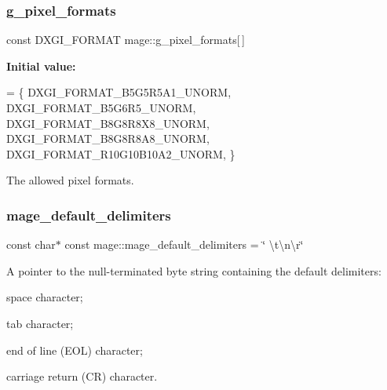 \subsubsection{\texorpdfstring{g\+\_\+pixel\+\_\+formats}{g\_pixel\_formats}}
{\footnotesize\ttfamily const D\+X\+G\+I\+\_\+\+F\+O\+R\+M\+AT mage\+::g\+\_\+pixel\+\_\+formats\mbox{[}$\,$\mbox{]}}

{\bfseries Initial value\+:}
\begin{DoxyCode}
= \{
        DXGI\_FORMAT\_B5G5R5A1\_UNORM,    
        DXGI\_FORMAT\_B5G6R5\_UNORM,      
        DXGI\_FORMAT\_B8G8R8X8\_UNORM,    
        DXGI\_FORMAT\_B8G8R8A8\_UNORM,    
        DXGI\_FORMAT\_R10G10B10A2\_UNORM, 
    \}
\end{DoxyCode}
The allowed pixel formats. \hypertarget{namespacemage_ae247ad66af37a4b0d67ddca9404ca01a}{}\label{namespacemage_ae247ad66af37a4b0d67ddca9404ca01a} 
\subsubsection{\texorpdfstring{mage\+\_\+default\+\_\+delimiters}{mage\_default\_delimiters}}
{\footnotesize\ttfamily const char$\ast$ const mage\+::mage\+\_\+default\+\_\+delimiters = \char`\"{} \textbackslash{}t\textbackslash{}n\textbackslash{}r\char`\"{}}

A pointer to the null-\/terminated byte string containing the default delimiters\+:
\begin{DoxyEnumerate}
\item space character;
\item tab character;
\item end of line (E\+OL) character;
\item carriage return (CR) character. 
\end{DoxyEnumerate}